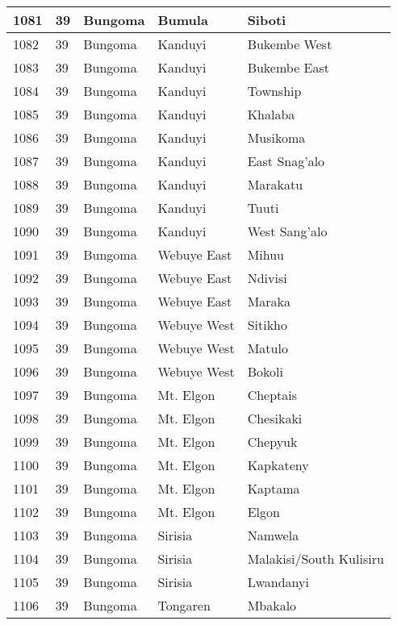 \begin{table}[!ht]
\begin{tabular}{|l|l|l|l|l|}
        1081 & 39 & Bungoma & Bumula & Siboti \\ \hline
        1082 & 39 & Bungoma & Kanduyi & Bukembe West \\ \hline
        1083 & 39 & Bungoma & Kanduyi & Bukembe East \\ \hline
        1084 & 39 & Bungoma & Kanduyi & Township \\ \hline
        1085 & 39 & Bungoma & Kanduyi & Khalaba \\ \hline
        1086 & 39 & Bungoma & Kanduyi & Musikoma \\ \hline
        1087 & 39 & Bungoma & Kanduyi & East Snag’alo \\ \hline
        1088 & 39 & Bungoma & Kanduyi & Marakatu \\ \hline
        1089 & 39 & Bungoma & Kanduyi & Tuuti \\ \hline
        1090 & 39 & Bungoma & Kanduyi & West Sang’alo \\ \hline
        1091 & 39 & Bungoma & Webuye East & Mihuu \\ \hline
        1092 & 39 & Bungoma & Webuye East & Ndivisi \\ \hline
        1093 & 39 & Bungoma & Webuye East & Maraka \\ \hline
        1094 & 39 & Bungoma & Webuye West & Sitikho \\ \hline
        1095 & 39 & Bungoma & Webuye West & Matulo \\ \hline
        1096 & 39 & Bungoma & Webuye West & Bokoli \\ \hline
        1097 & 39 & Bungoma & Mt. Elgon & Cheptais \\ \hline
        1098 & 39 & Bungoma & Mt. Elgon & Chesikaki \\ \hline
        1099 & 39 & Bungoma & Mt. Elgon & Chepyuk \\ \hline
        1100 & 39 & Bungoma & Mt. Elgon & Kapkateny \\ \hline
        1101 & 39 & Bungoma & Mt. Elgon & Kaptama \\ \hline
        1102 & 39 & Bungoma & Mt. Elgon & Elgon \\ \hline
        1103 & 39 & Bungoma & Sirisia & Namwela \\ \hline
        1104 & 39 & Bungoma & Sirisia & Malakisi/South Kulisiru \\ \hline
        1105 & 39 & Bungoma & Sirisia & Lwandanyi \\ \hline
        1106 & 39 & Bungoma & Tongaren & Mbakalo \\ \hline

\end{tabular}
\end{table}
